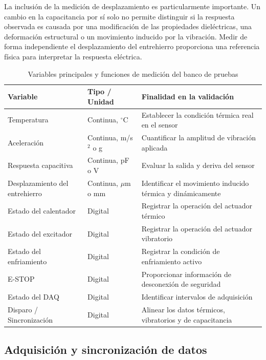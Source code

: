 \documentclass[conference]{IEEEtran}
\begin{document}
La inclusión de la medición de desplazamiento es particularmente importante. Un cambio en la capacitancia por sí solo no permite distinguir si la respuesta observada es causada por una modificación de las propiedades dieléctricas, una deformación estructural o un movimiento inducido por la vibración. Medir de forma independiente el desplazamiento del entrehierro proporciona una referencia física para interpretar la respuesta eléctrica.

\begin{table}[t]
\caption{Variables principales y funciones de medición del banco de pruebas}
\label{tab:variables}
\centering
\footnotesize
\begin{tabular}{p{} p{} p{}}
\toprule
\textbf{Variable} & \textbf{Tipo / Unidad} & \textbf{Finalidad en la validación} \\
\midrule
Temperatura & Continua, $^{\circ}$C & Establecer la condición térmica real en el sensor \\
Aceleración & Continua, m/s$^2$ o g & Cuantificar la amplitud de vibración aplicada \\
Respuesta capacitiva & Continua, pF o V & Evaluar la salida y deriva del sensor \\
Desplazamiento del entrehierro & Continua, $\mu$m o mm & Identificar el movimiento inducido térmica y dinámicamente \\
Estado del calentador & Digital & Registrar la operación del actuador térmico \\
Estado del excitador & Digital & Registrar la operación del actuador vibratorio \\
Estado del enfriamiento & Digital & Registrar la condición de enfriamiento activo \\
E-STOP & Digital & Proporcionar información de desconexión de seguridad \\
Estado del DAQ & Digital & Identificar intervalos de adquisición \\
Disparo / Sincronización & Digital & Alinear los datos térmicos, vibratorios y de capacitancia \\
\bottomrule
\end{tabular}
\end{table}

\subsection{Adquisición y sincronización de datos}
\end{document}
